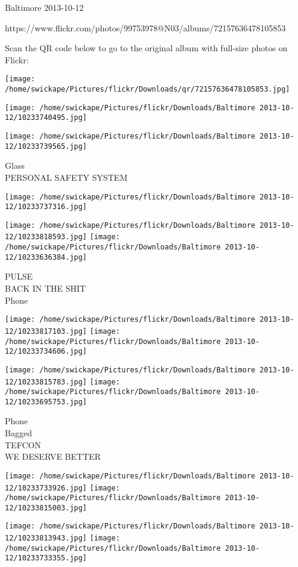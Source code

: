 \documentclass[10pt,letterpaper]{article}
\begin{document}
Baltimore 2013-10-12

https://www.flickr.com/photos/99753978@N03/albums/72157636478105853

Scan the QR code below to go to the original album with full-size photos on Flickr:

\texttt{[image: /home/swickape/Pictures/flickr/Downloads/qr/72157636478105853.jpg]}
\pagebreak

\texttt{[image: /home/swickape/Pictures/flickr/Downloads/Baltimore 2013-10-12/10233740495.jpg]}

\vspace{0.25in}
\texttt{[image: /home/swickape/Pictures/flickr/Downloads/Baltimore 2013-10-12/10233739565.jpg]}

Glass\\
PERSONAL SAFETY SYSTEM
\pagebreak

\texttt{[image: /home/swickape/Pictures/flickr/Downloads/Baltimore 2013-10-12/10233737316.jpg]}

\vspace{0.25in}
\texttt{[image: /home/swickape/Pictures/flickr/Downloads/Baltimore 2013-10-12/10233818593.jpg]}
\texttt{[image: /home/swickape/Pictures/flickr/Downloads/Baltimore 2013-10-12/10233636384.jpg]}

PULSE\\
BACK IN THE SHIT\\
Phone
\pagebreak

\texttt{[image: /home/swickape/Pictures/flickr/Downloads/Baltimore 2013-10-12/10233817103.jpg]}
\texttt{[image: /home/swickape/Pictures/flickr/Downloads/Baltimore 2013-10-12/10233734606.jpg]}

\texttt{[image: /home/swickape/Pictures/flickr/Downloads/Baltimore 2013-10-12/10233815783.jpg]}
\texttt{[image: /home/swickape/Pictures/flickr/Downloads/Baltimore 2013-10-12/10233695753.jpg]}

Phone\\
Bagged\\
TEFCON\\
WE DESERVE BETTER
\pagebreak

\texttt{[image: /home/swickape/Pictures/flickr/Downloads/Baltimore 2013-10-12/10233733926.jpg]}
\texttt{[image: /home/swickape/Pictures/flickr/Downloads/Baltimore 2013-10-12/10233815003.jpg]}

\texttt{[image: /home/swickape/Pictures/flickr/Downloads/Baltimore 2013-10-12/10233813943.jpg]}
\texttt{[image: /home/swickape/Pictures/flickr/Downloads/Baltimore 2013-10-12/10233733355.jpg]}
\end{document}
